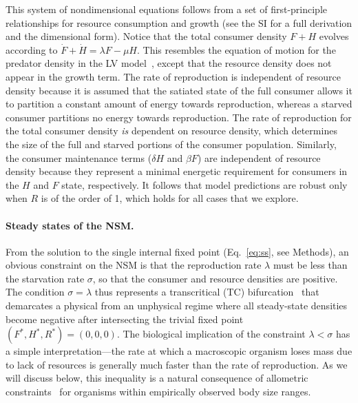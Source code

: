 \documentclass[twocolumn,preprintnumbers,amsmath,amssymb,superscriptaddress]{revtex4}
\begin{document}
This system of nondimensional equations follows from a set of first-principle
relationships for resource consumption and growth (see the SI for a full derivation and the dimensional form).
Notice that the total consumer density $F+H$ evolves according to $\dot{F}+\dot{H}=\lambda F-\mu H$.
This resembles the equation of motion for the predator density in the LV model~\citep{murray2011mathematical}, except that the resource density does not appear in the growth term.
The rate of reproduction is independent of resource density because it is
assumed that the satiated state of the full consumer allows it to partition a
constant amount of energy towards reproduction, whereas a starved consumer
partitions no energy towards reproduction.  The rate of reproduction for the
total consumer density \emph{is} dependent on resource density, which
determines the size of the full and starved portions of the consumer
population.  Similarly, the consumer maintenance terms ($\delta H$ and
$\beta F$) are independent of resource density because they represent a
minimal energetic requirement for consumers in the $H$ and $F$ state,
respectively.  It follows that model predictions are robust only when $R$ is
of the order of 1, which holds for all cases that we explore.


\noindent \paragraph*{ {\bf Steady states of the NSM.}} From the solution to the single internal fixed point (Eq.~\eqref{eq:ss}, see Methods), an obvious constraint on the NSM is that the reproduction rate $\lambda$ must be less than the starvation rate $\sigma$, so that the consumer and resource densities are positive.
The condition $\sigma = \lambda$ thus represents a transcritical (TC) bifurcation~\citep{Strogatz:2008wo} that demarcates a physical from an unphysical regime where all steady-state densities become negative after intersecting the trivial fixed point $(F^*,H^*,R^*)=(0,0,0)$.
The biological implication of the constraint $\lambda<\sigma$ has a simple interpretation---the rate at which a macroscopic organism loses mass due to lack of resources is generally much faster than the rate of reproduction.
As we will discuss below, this inequality is a natural consequence of allometric constraints~\citep{Kempes:2012hy} for organisms within empirically observed body size ranges. %
\end{document}
